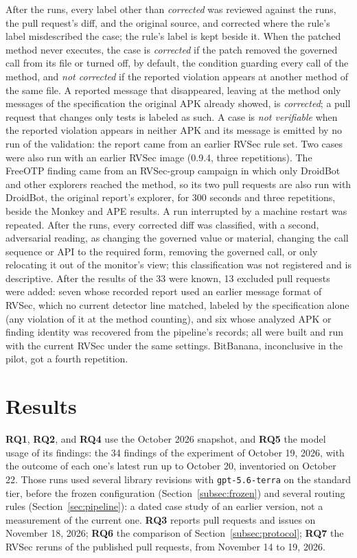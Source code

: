 \documentclass[conference]{IEEEtran}
\newcommand{\researchq}[1]{\textbf{RQ#1}}
\begin{document}
After the runs, every label other than \emph{corrected} was reviewed against
the runs, the pull request's diff, and the original source, and corrected where
the rule's label misdescribed the case; the rule's label is kept beside it.
When the patched method never executes, the case is \emph{corrected} if the
patch removed the governed call from its file or turned off, by default, the
condition guarding every call of the method, and \emph{not corrected} if the
reported violation appears at another method of the same file. A reported
message that disappeared, leaving at the method only messages of the
specification the original APK already showed, is \emph{corrected}; a pull
request that changes only tests is labeled as such. A case is \emph{not
verifiable} when the reported violation appears in neither APK and its message
is emitted by no run of the validation: the report came from an earlier RVSec
rule set. Two cases were also run with an earlier RVSec image (0.9.4, three
repetitions). The FreeOTP finding came from an RVSec-group campaign in which only
DroidBot and other explorers reached the method, so its two pull requests are
also run with DroidBot, the original report's explorer, for 300 seconds and
three repetitions, beside the Monkey and APE results. A run interrupted by a
machine restart was repeated. After the runs, every corrected diff was
classified, with a second, adversarial reading, as changing the governed
value or material, changing the call sequence or API to the required form,
removing the governed call, or only relocating it out of the monitor's view;
this classification was not registered and is descriptive. After the results
of the 33 were known, 13 excluded pull requests were added: seven whose
recorded report used an earlier message format of RVSec, which no current
detector line matched, labeled by the specification alone (any violation of it
at the method counting), and six whose analyzed APK or finding identity was
recovered from the pipeline's records; all were built and run with the current
RVSec under the same settings. BitBanana, inconclusive in the pilot, got a
fourth repetition.

\section{Results}
\label{sec:results}

\researchq{1}, \researchq{2}, and \researchq{4} use the October 2026
snapshot, and \researchq{5} the model usage of its findings: the 34 findings
of the experiment of October 19, 2026, with the outcome of each one's latest
run up to October 20, inventoried on October 22. Those runs used several
library revisions with \texttt{gpt-5.6-terra} on the standard tier, before the
frozen configuration (Section~\ref{subsec:frozen}) and several routing rules
(Section~\ref{sec:pipeline}): a dated case study of an earlier version, not a
measurement of the current one. \researchq{3} reports pull requests and issues
on November 18, 2026; \researchq{6} the comparison of
Section~\ref{subsec:protocol}; \researchq{7} the RVSec reruns of the published
pull requests, from November 14 to 19, 2026.
\end{document}
